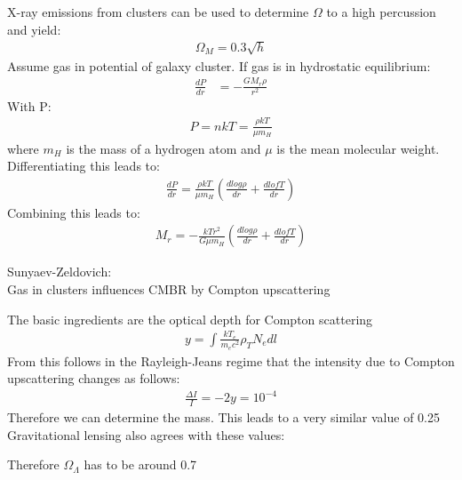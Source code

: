 \documentclass[11pt,a4paper]{article}
\begin{document}
X-ray emissions from clusters can be used to determine $\Omega$ to a high percussion and yield: 
\begin{align*}
   \Omega_M = 0.3 \sqrt h 
\end{align*}
Assume gas in potential of galaxy cluster. If gas is in hydrostatic equilibrium:
\begin{align*}
    \frac {dP}{dr} &= - \frac {GM_r \rho}{r^2} 
\end{align*}
With P:
\begin{align*}
    P = nkT = \frac {\rho k T }{\mu m_H} 
\end{align*}
where $m_H$ is the mass of a hydrogen atom and $\mu$ is the mean molecular weight.
Differentiating this leads to: 
\begin{align*}
    \frac {dP}{dr} = \frac {\rho k T }{\mu m_H}  (\frac {d log \rho}{dr} + \frac {d lof T}{dr})
\end{align*}
Combining this leads to:
\begin{align*}
    M_r = -\frac {kTr^2} {G \mu m_H} (\frac {d log \rho}{dr} + \frac {d lof T}{dr})
\end{align*}

Sunyaev-Zeldovich:\\
Gas in clusters influences CMBR by Compton upscattering

The basic ingredients are the optical depth for
Compton scattering
\begin{align*}
    y = \int \frac {kT_e}{m_ec^2} \rho_T N_e dl 
\end{align*}
From this follows in the Rayleigh-Jeans regime
that the intensity due to Compton upscattering
changes as follows:
\begin{align*}
    \frac {\Delta I} I = -2 y = 10^{-4} 
\end{align*}
Therefore we can determine the mass.
This leads to a very similar value of 0.25
Gravitational lensing also agrees with these values:

Therefore $\Omega_\Lambda$ has to be around 0.7
\end{document}
